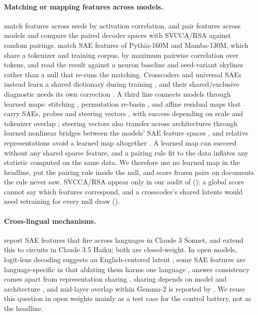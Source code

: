 \paragraph{Matching or mapping features across models.}
\citet{bricken2023monosemanticity} match features across seeds by activation correlation, and
\citet{lan2024universal} pair features across models and compare the paired decoder spaces with
SVCCA/RSA \citep{raghu2017svcca,kriegeskorte2008rsa} against random pairings.
\citet{wang2025universality} match SAE features of Pythia-160M and Mamba-130M, which share a
tokenizer and training corpus, by maximum pairwise correlation over tokens, and read the result
against a neuron baseline and seed-variant skylines rather than a null that re-runs the matching. Crosscoders and
universal SAEs instead learn a shared dictionary during training
\citep{lindsey2024crosscoders,thasarathan2025usae}, and their shared/exclusive diagnostic needs its
own correction \citep{minder2025crosscoder}. A third line connects models through learned maps:
stitching \citep{bansal2021stitching}, permutation re-basin \citep{ainsworth2023rebasin}, and affine
residual maps that carry SAEs, probes and steering vectors
\citep{chen2025stitching,huang2025platonictransfer}, with success depending on scale and
tokenizer overlap \citep{gorbett2026linear}; steering vectors also transfer across architectures
through learned nonlinear bridges between the models' SAE feature spaces
\citep{agarwal2026crossarch}, and relative representations avoid a learned map
altogether \citep{moschella2023relative}. A learned map can succeed without any shared sparse
feature, and a pairing rule fit to the data inflates any statistic computed on the same data. We
therefore use no learned map in the headline, put the pairing rule inside the null, and score
frozen pairs on documents the rule never saw. SVCCA/RSA appear only in our audit of
\citet{lan2024universal} (): a global score cannot say which features correspond, and
a crosscoder's shared latents would need retraining for every null draw ().

\paragraph{Cross-lingual mechanisms.}
\citet{templeton2024scaling} report SAE features that fire across languages in Claude 3 Sonnet,
and \citet{lindsey2025biology} extend this to circuits in Claude 3.5 Haiku; both are closed-weight.
In open models, logit-lens decoding suggests an English-centered latent
\citep{wendler2024llamaspeak}, some SAE features are language-specific in that ablating them harms
one language \citep{deng2025languagespecific}, answer consistency comes apart from representation
sharing \citep{ifergan2024beneath}, sharing depends on model and architecture
\citep{bogdanov2026geoinv}, and mid-layer overlap within Gemma-2 is reported by
\citet{son2025semanticconvergence}. We reuse this question in open weights mainly as a test case
for the control battery, not as the headline.

